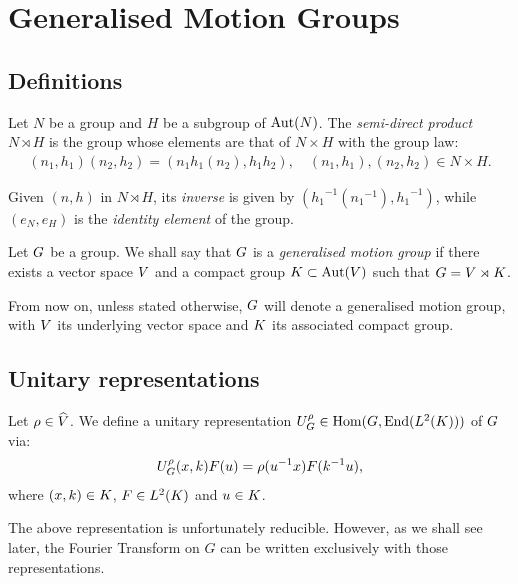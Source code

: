 \chapter{Generalised Motion Groups}
\label{chapter:generalised_motion_groups}

\section{Definitions}
\label{section:definitions}

\begin{definition}
\label{definition:semi-direct_products}
    Let $N$ be a group and $H$ be a subgroup of $\operatorname{Aut}(N)$.
    The \emph{semi-direct product} $N \rtimes H$ is the group whose elements are that of $N \times H$ with the group law:
    \begin{align}
        (n_1, h_1) (n_2, h_2) = (n_1 h_1(n_2), h_1 h_2), \quad (n_1, h_1), (n_2, h_2) \in N \times H.
    \end{align}

    Given $(n, h)$ in $N \rtimes H$, its \emph{inverse} is given by $({h_1}^{-1}({n_1}^{-1}), {h_1}^{-1})$,
    while $(e_N, e_H)$ is the \emph{identity element} of the group.
\end{definition}

\begin{definition}
\label{definition:generalised_motion_group}
    Let $G$ be a group.
    We shall say that $G$ is a \emph{generalised motion group}
    if there exists a vector space $V$ and a compact group $K \subset \operatorname{Aut}(V)$ such that $G = V \rtimes K$.
\end{definition}

From now on, unless stated otherwise,
$G$ will denote a generalised motion group,
with $V$ its underlying vector space and $K$ its associated compact group.

\section{Unitary representations}
\label{section:unitary_representations}

\begin{definition}
\label{definition:reducible_representation}
    Let $\rho \in \widehat{V}$.
    We define a unitary representation $U^{\rho}_G \in \operatorname{Hom}(G, \operatorname{End}({L^{2} (K)}))$ of $G$ via:
    \begin{align}
        U^{\rho}_G (x, k) F(u) = \rho(u^{-1} x) F(k^{-1} u),
    \end{align}
    where $(x, k) \in K$, $F \in {L^{2} (K)}$ and $u \in K$.
\end{definition}

The above representation is unfortunately reducible.
However, as we shall see later, the Fourier Transform on $G$ can be written exclusively with those representations.
